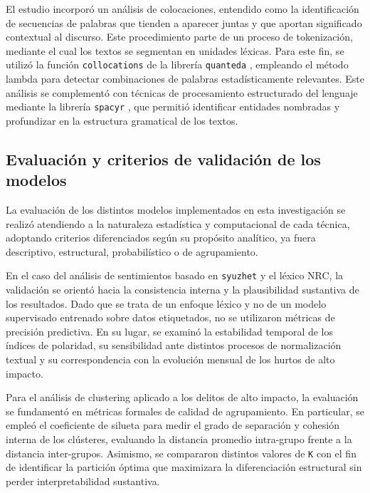 \documentclass[sn-basic,pdflatex]{sn-jnl}
\theoremstyle{remark}
\theoremstyle{definition}
\begin{document}
El estudio incorporó un análisis de colocaciones, entendido como la
identificación de secuencias de palabras que tienden a aparecer juntas y
que aportan significado contextual al discurso. Este procedimiento parte
de un proceso de tokenización, mediante el cual los textos se segmentan
en unidades léxicas. Para este fin, se utilizó la función
\texttt{collocations} de la librería \texttt{quanteda}
\citep{benoit2018}, empleando el método lambda para detectar
combinaciones de palabras estadísticamente relevantes. Este análisis se
complementó con técnicas de procesamiento estructurado del lenguaje
mediante la librería \texttt{spacyr} \citep{benoit_matsuo2023}, que
permitió identificar entidades nombradas y profundizar en la estructura
gramatical de los textos.

\subsection{Evaluación y criterios de validación de los
modelos}\label{evaluaciuxf3n-y-criterios-de-validaciuxf3n-de-los-modelos}

La evaluación de los distintos modelos implementados en esta
investigación se realizó atendiendo a la naturaleza estadística y
computacional de cada técnica, adoptando criterios diferenciados según
su propósito analítico, ya fuera descriptivo, estructural,
probabilístico o de agrupamiento.

En el caso del análisis de sentimientos basado en \texttt{syuzhet} y el
léxico NRC, la validación se orientó hacia la consistencia interna y la
plausibilidad sustantiva de los resultados. Dado que se trata de un
enfoque léxico y no de un modelo supervisado entrenado sobre datos
etiquetados, no se utilizaron métricas de precisión predictiva. En su
lugar, se examinó la estabilidad temporal de los índices de polaridad,
su sensibilidad ante distintos procesos de normalización textual y su
correspondencia con la evolución mensual de los hurtos de alto impacto.

Para el análisis de clustering aplicado a los delitos de alto impacto,
la evaluación se fundamentó en métricas formales de calidad de
agrupamiento. En particular, se empleó el coeficiente de silueta para
medir el grado de separación y cohesión interna de los clústeres,
evaluando la distancia promedio intra-grupo frente a la distancia
inter-grupos. Asimismo, se compararon distintos valores de \texttt{K}
con el fin de identificar la partición óptima que maximizara la
diferenciación estructural sin perder interpretabilidad sustantiva.
\end{document}
